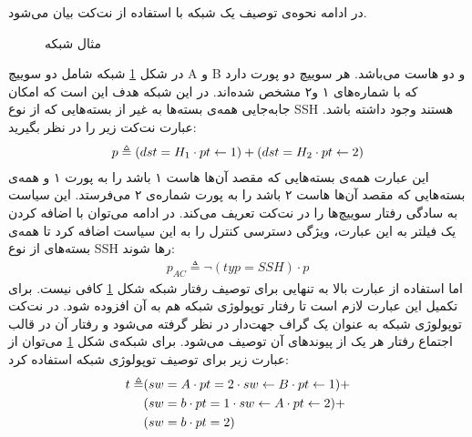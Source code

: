 در ادامه نحوه‌ی توصیف یک شبکه با استفاده از نت‌کت بیان می‌شود.
\begin{figure}
    \centering
    \caption{مثال شبکه}
    \label{fig:netkat:ssh}
\end{figure}
در شکل
\ref{fig:netkat:ssh}
 شبکه شامل دو سوییچ
A و ‌B
و دو هاست
می‌باشد.
هر سوییچ دو پورت دارد که با شماره‌های ۱ و۲ مشخص شده‌اند.
در این شبکه هدف این است که امکان جا‌به‌جایی همه‌ی بسته‌ها به غیر از بسته‌هایی که از نوع
SSH
هستند وجود داشته باشد.
عبارت نت‌کت زیر را در نظر بگیرید:
\begin{align*}
    p \triangleq (dst = H_1 \cdot pt \leftarrow 1) +
    (dst = H_2 \cdot pt \leftarrow 2)
\end{align*}
این عبارت همه‌ی بسته‌هایی که مقصد آن‌ها هاست ۱ باشد را به پورت ۱ و همه‌ی بسته‌هایی که مقصد‌ آن‌ها هاست ۲ باشد را به پورت شماره‌ی ۲ می‌فرستد.
این سیاست
به سادگی رفتار سوییچ‌ها را در نت‌کت تعریف می‌کند.
در ادامه می‌توان با اضافه کردن یک فیلتر به این عبارت، ویژگی دسترسی کنترل
را به این سیاست اضافه کرد تا همه‌ی بسته‌های از نوع
SSH
رها شوند:
\begin{align*}
    p_{AC} \triangleq \neg(typ = SSH)\cdot p
\end{align*}
اما استفاده از عبارت بالا به تنهایی برای توصیف رفتار شبکه شکل
\ref{fig:netkat:ssh}
کافی‌ نیست.
برای تکمیل این عبارت لازم است تا رفتار توپولوژی
شبکه‌ هم به آن افزوده شود.
در نت‌کت توپولوژی شبکه به عنوان یک گراف جهت‌دار در نظر گرفته می‌شود و رفتار آن در قالب اجتماع رفتار هر یک از پیوندهای
 آن توصیف می‌شود.
برای شبکه‌ی شکل
\ref{fig:netkat:ssh}
می‌توان از عبارت زیر برای توصیف توپولوژی شبکه استفاده کرد:
\begin{align*}
    t \triangleq & (sw = A \cdot pt = 2 \cdot sw \leftarrow B \cdot pt \leftarrow 1) + \\
                 & (sw = b \cdot pt = 1 \cdot sw \leftarrow A \cdot pt \leftarrow 2) + \\
                 & (sw = b \cdot pt = 2)
\end{align*}
